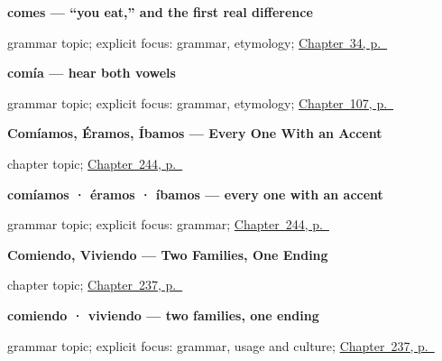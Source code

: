 \noindent\begin{minipage}[t]{\linewidth}
\raggedright
\textbf{comes — \textquotedblleft{}you eat,\textquotedblright{} and the first real difference}\par
\footnotesize grammar topic; explicit focus: grammar, etymology; \hyperref[ch:spanish-comer]{Chapter~34, p.~\pageref*{ch:spanish-comer}}
\end{minipage}\par\smallskip

\noindent\begin{minipage}[t]{\linewidth}
\raggedright
\textbf{comía — hear both vowels}\par
\footnotesize grammar topic; explicit focus: grammar, etymology; \hyperref[ch:spanish-imperfecto]{Chapter~107, p.~\pageref*{ch:spanish-imperfecto}}
\end{minipage}\par\smallskip

\noindent\begin{minipage}[t]{\linewidth}
\raggedright
\textbf{Comíamos, Éramos, Íbamos --- Every One With an Accent}\par
\footnotesize chapter topic; \hyperref[ch:comiamos]{Chapter~244, p.~\pageref*{ch:comiamos}}
\end{minipage}\par\smallskip

\noindent\begin{minipage}[t]{\linewidth}
\raggedright
\textbf{comíamos · éramos · íbamos — every one with an accent}\par
\footnotesize grammar topic; explicit focus: grammar; \hyperref[ch:comiamos]{Chapter~244, p.~\pageref*{ch:comiamos}}
\end{minipage}\par\smallskip

\noindent\begin{minipage}[t]{\linewidth}
\raggedright
\textbf{Comiendo, Viviendo --- Two Families, One Ending}\par
\footnotesize chapter topic; \hyperref[ch:comiendo]{Chapter~237, p.~\pageref*{ch:comiendo}}
\end{minipage}\par\smallskip

\noindent\begin{minipage}[t]{\linewidth}
\raggedright
\textbf{comiendo · viviendo — two families, one ending}\par
\footnotesize grammar topic; explicit focus: grammar, usage and culture; \hyperref[ch:comiendo]{Chapter~237, p.~\pageref*{ch:comiendo}}
\end{minipage}\par\smallskip


